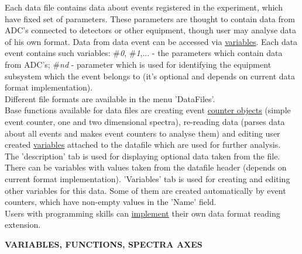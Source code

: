 \documentclass[a4paper]{article}
\begin{document}
{
Each data file contains data about events registered in the experiment, which have fixed set of parameters. 
These parameters are thought to contain data from ADC's connected to detectors or other equipment, though user may analyse data of his own format. 
Data from data event can be accessed via \hyperlink{variable}{variables}.
Each data event contains such variables: \textit{$\#$0}, \textit{$\#$1},... - the parameters which contain data from ADC's; \textit{$\#$nd} - parameter which is used for identifying the equipment subsystem which the event belongs to (it's optional and depends on current data format implementation). 
\\
Different file formats are available in the menu 'DataFiles'. 
\\
Base functions available for data files are creating event \hyperlink{counters}{counter objects} (simple event counter, one and two dimensional spectra), re-reading data (parses data about all events and makes event counters to analyse them) and editing user created \hyperlink{variable}{variables} attached to the datafile which are used for further analysis.
\\
The 'description' tab is used for displaying optional data taken from the file. 
There can be variables with values taken from the datafile header (depends on current format implementation). 'Variables' tab is used for creating and editing other variables for this data. Some of them are created automatically by event counters, which have non-empty values in the 'Name' field.
\\
Users with programming skills can \hyperlink{devtool}{implement} their own data format reading extension.
}
%
\hypertarget{functions}{\\}
\begin{center}\textbf{VARIABLES, FUNCTIONS, SPECTRA AXES}\end{center}
\end{document}
